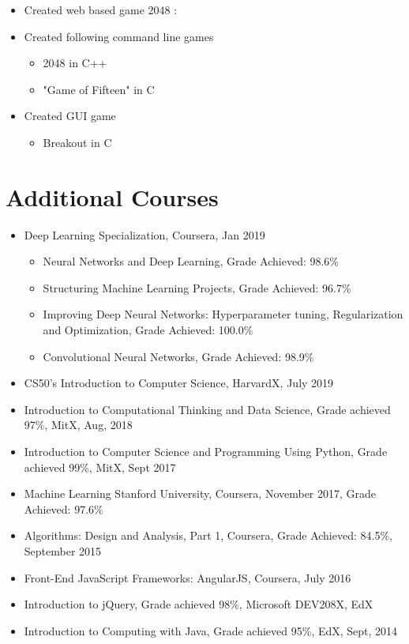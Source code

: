 \documentclass[a4paper,10pt]{article}
\begin{document}
\begin{itemize}
                			\item Created web based game 2048 : 
				\item Created following command line games
				    \begin{itemize}
				        \item 2048 in C++
				        \item "Game of Fifteen" in C
				    \end{itemize}
				\item Created GUI game
				    \begin{itemize}
				        \item Breakout in C
				    \end{itemize}
			\end{itemize}
			
    \section{Additional Courses}
	\begin{itemize}
	        \item Deep Learning Specialization, Coursera, Jan 2019
	            \begin{itemize}
	                \item Neural Networks and Deep Learning, Grade Achieved: 98.6\%
                    \item Structuring Machine Learning Projects, Grade Achieved: 96.7\%
                    \item Improving Deep Neural Networks: Hyperparameter tuning, Regularization and Optimization, Grade Achieved: 100.0\%
                    \item Convolutional Neural Networks, Grade Achieved: 98.9\%
	            \end{itemize}
            \item CS50's Introduction to Computer Science, HarvardX, July 2019
	        \item Introduction to Computational Thinking and Data Science, Grade achieved 97\%, MitX, Aug, 2018
	        \item Introduction to Computer Science and Programming Using Python, Grade achieved  99\%, MitX, Sept 2017
	        \item Machine Learning Stanford University, Coursera, November 2017, Grade Achieved: 97.6\%
	        \item Algorithms: Design and Analysis, Part 1, Coursera, Grade Achieved: 84.5\%, September 2015
	        \item Front-End JavaScript Frameworks: AngularJS, Coursera, July 2016
	        \item Introduction to jQuery,  Grade achieved 98\%, Microsoft DEV208X, EdX
	        \item Introduction to Computing with Java, Grade achieved 95\%, EdX, Sept, 2014
	    \end{itemize}
	
\end{document}
